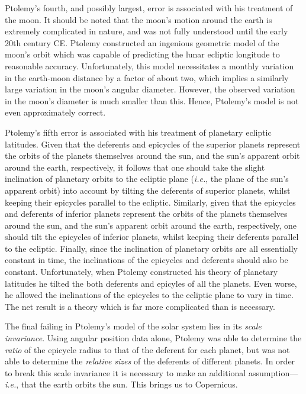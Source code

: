 Ptolemy's fourth, and possibly largest, error is associated with his treatment
of the moon. It should be noted that the moon's motion around the
earth is extremely complicated in nature,  and was not fully understood until
the early 20th century CE. Ptolemy constructed an ingenious geometric
model of the moon's orbit which was capable of predicting
the lunar ecliptic longitude to reasonable accuracy. Unfortunately, this
model necessitates a monthly variation in the earth-moon distance  by a factor of about two, 
which  implies a similarly large variation in the moon's angular diameter. However, the observed variation in the   moon's diameter is much smaller than this. Hence, Ptolemy's model is not even approximately correct.

Ptolemy's fifth error is associated with his treatment of planetary
ecliptic latitudes. Given that the deferents and epicycles of
the superior planets represent the orbits of the planets themselves around the
sun, and the sun's apparent orbit around the earth, respectively, it follows
that one should take the slight inclination of planetary orbits to
the ecliptic plane ({\em i.e.}, the plane of the sun's apparent orbit)
into account by tilting the deferents of superior planets, whilst keeping their epicycles
parallel to the ecliptic. Similarly, given that the epicycles and deferents of
inferior planets represent the orbits of the planets themselves around the
sun, and the sun's apparent orbit around the earth, respectively, one should tilt the epicycles of
inferior planets, whilst keeping their deferents parallel to the ecliptic. 
Finally, since the inclination of  planetary orbits are all essentially constant in time, the inclinations
of the epicycles and deferents should also be constant. 
Unfortunately, when Ptolemy constructed his theory of
planetary latitudes he tilted  the both deferents and epicyles of
all the planets. Even worse, he allowed the inclinations of the epicycles to
the ecliptic plane to vary in time. The net result is a theory which is far more
complicated than is necessary.

The final failing in Ptolemy's model of the solar system lies in its {\em scale invariance}. 
Using angular position data alone, Ptolemy was  able to determine the {\em ratio}\/
of the epicycle radius to that of the deferent for each planet, but was
not able to determine the {\em relative sizes}\/ of the deferents of different planets. 
In order to break this scale invariance it is necessary to make an
additional assumption---{\em i.e.}, that the earth orbits the sun. This
brings us to Copernicus.

